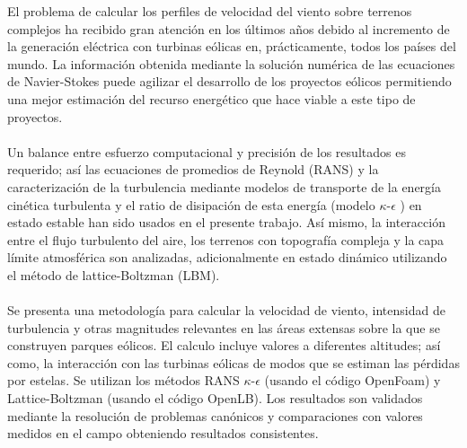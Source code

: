 


\begin{abstracts}        %

El problema de calcular los perfiles de velocidad del viento sobre terrenos complejos ha recibido gran atención en los últimos años debido al incremento de la generación eléctrica con turbinas eólicas en, prácticamente, todos los países del mundo. La información obtenida mediante la solución numérica de las ecuaciones de Navier-Stokes puede agilizar el desarrollo de los proyectos eólicos permitiendo una mejor estimación del recurso energético que hace viable a este tipo de proyectos.
\\
\\
\hspace*{1em} Un balance entre esfuerzo computacional y precisión de los resultados es requerido; así las ecuaciones de promedios de Reynold (RANS) y la caracterización de la  turbulencia mediante modelos de transporte de la energía cinética turbulenta y el ratio de disipación de esta energía (modelo $\kappa$-$\epsilon$ ) en estado estable han sido usados en el presente trabajo. Así mismo, la interacción entre el flujo turbulento del aire, los terrenos con topografía compleja y la capa límite atmosférica son analizadas, adicionalmente en estado dinámico utilizando el método de lattice-Boltzman (LBM).
\\
\\
\hspace*{1em}Se presenta una metodología para calcular la velocidad de viento, intensidad de turbulencia y otras magnitudes relevantes en las áreas extensas sobre la que se construyen parques eólicos. El calculo incluye valores a diferentes altitudes; así como, la interacción con las turbinas eólicas de modos que se estiman las pérdidas por estelas. Se utilizan los métodos RANS $\kappa$-$\epsilon$ (usando el código OpenFoam) y Lattice-Boltzman (usando el código OpenLB). Los resultados son validados mediante la resolución de problemas canónicos y comparaciones con valores medidos en el campo obteniendo resultados consistentes.



\end{abstracts}


